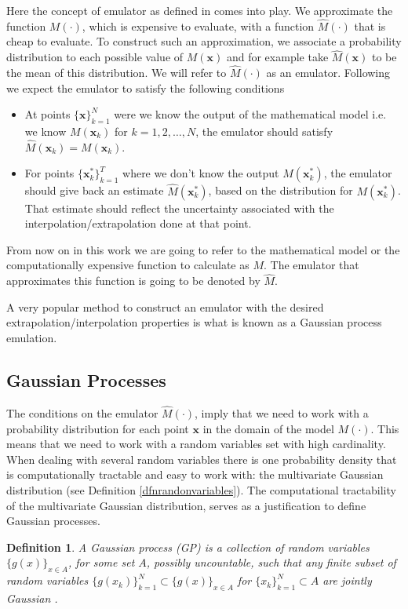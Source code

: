 \documentclass[12pt]{book}
\newtheorem{definition}{Definition}
\newcommand{\x}{\textbf{x}}
\begin{document}
Here the concept of emulator as defined in \cite{o2006bayesian} 
comes into play. We 
approximate the function $M(\cdot)$, which is  expensive to evaluate,
 with a function $\widehat{M}(\cdot)$ that is cheap to evaluate. To construct such an approximation,   
we  associate a 
probability distribution to each  possible value of $M(\textbf{x})$ and for example take 
$\widehat{M}(\x)$ to be  the mean
of this distribution. We will refer to $\widehat{M}(\cdot)$ as an emulator. 
Following \cite{o2006bayesian} we expect the emulator to satisfy the following conditions
\begin{itemize}
\item At points $\{\x\}_{k=1}^{N}$  were we know the output of the mathematical model i.e. we know 
$M(\x_{k})$ for $k=1,2,\ldots, N$,
the emulator should satisfy $\widehat{M}(\x_{k})=M(\x_{k})$.
\item For  points $\{\x_{k}^{*}\}_{k=1}^{T}$ where we don't know the output $M(\x_{k}^{*})$, the emulator should
give back an estimate $\widehat{M}(\textbf{x}_{k}^{*})$, based on the distribution for $M(\textbf{x}_{k}^{*})$. 
That estimate should reflect the uncertainty associated with
the interpolation/extrapolation done at that point.
\end{itemize} 

From now on in this work we are going to refer to the mathematical model or the computationally expensive
function to calculate as $M$. The emulator that approximates this function is going to be denoted by 
$\widehat{M}$.

A very popular  method to construct an emulator with the desired
extrapolation/interpolation properties is what is known as a Gaussian process emulation.  

\subsection{Gaussian Processes}
The conditions on the emulator $\widehat{M}(\cdot)$, imply that we need
to work with a probability distribution for each point $\textbf{x}$ in the domain of the model $M(\cdot)$.
This means that  we need to work with 
 a random variables set with high cardinality. 
When dealing with 
several random variables there is one probability density that is computationally tractable and
easy to work with: the multivariate Gaussian distribution (see Definition \ref{dfnrandonvariables}). 
The computational tractability  of the multivariate Gaussian distribution, serves as a justification
to define Gaussian processes.
\begin{definition}\label{dfnGP}
A Gaussian process (GP) is a collection of random variables $\{g(x)\}_{x\in A}$, for some set $A$, 
possibly uncountable,
 such that any finite subset of random variables
 $\{g(x_{k})\}_{k=1}^{N}\subset\{g(x)\}_{x\in A}$ for 
$\{x_{k}\}_{k=1}^{N}\subset A$ are jointly Gaussian
\cite{rasmussen2006gaussian}. 
\end{definition}
\end{document}
